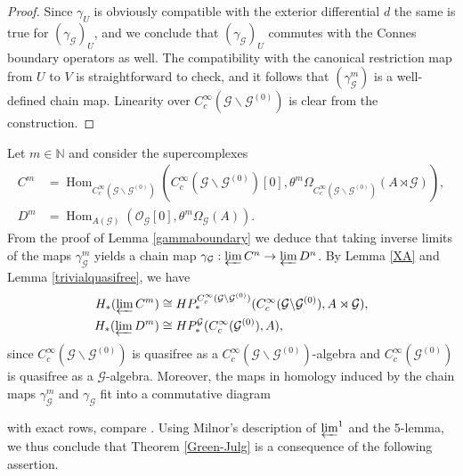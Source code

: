 \documentclass{amsart}
\newcommand{\G}{\mathcal{G}}
\renewcommand{\O}{\mathcal{O}}
\newcommand{\ccinfty}{C_c^\infty}
\DeclareMathOperator{\Hom}{Hom}
\begin{document}
\begin{proof}
Since $ \gamma_U $ is obviously compatible with the exterior differential $ d $ the same is true for $ (\gamma_\G)_U $, 
and we conclude that $ (\gamma_\G)_U $ commutes with the Connes boundary operators as well. The compatibility with the canonical restriction map from $ U $ to $ V $  
is straightforward to check, and it follows that $ (\gamma^m_\G) $ is a well-defined chain map. Linearity over $ \ccinfty(\G \backslash \G^{(0)}) $ is clear from the construction. 
\end{proof}

Let $ m \in \mathbb{N} $ and consider the supercomplexes    
\begin{align*}
C^m &= \Hom_{\ccinfty(\G\backslash\G^{(0)})}(\ccinfty(\G\backslash\G^{(0)})[0], 
\theta^m \Omega_{\ccinfty(\G\backslash\G^{(0)})}(A \rtimes \G)), \\
D^m &= \Hom_{A(\G)}(\O_\G[0], \theta^m \Omega_{\G}(A)). 
\end{align*} 
From the proof of Lemma \ref{gammaboundary} we deduce that taking inverse limits of the maps $ \gamma_\G^m $ yields a chain map $ \gamma_\G: \varprojlim C^n \rightarrow \varprojlim D^n $. 
By Lemma \ref{XA} and Lemma \ref{trivialquasifree}, we have
\begin{align*}
H_*(\varprojlim C^m) &\cong HP_*^{\ccinfty(\G\backslash\G^{(0)})}(\ccinfty(\G\backslash \G^{(0)}), A \rtimes \G), \\ 
H_*(\varprojlim D^m) &\cong HP_*^\G(\ccinfty(\G^{(0)}),A), 
\end{align*}  
since $ \ccinfty(\G \backslash \G^{(0)}) $ is quasifree as a $ \ccinfty(\G \backslash \G^{(0)}) $-algebra and $ \ccinfty(\G^{(0)}) $ is quasifree as a $ \G $-algebra. 
Moreover, the maps in homology induced by the chain maps $ \gamma^m_\G $ and $ \gamma_\G $ fit into a commutative diagram  
\begin{center}
\end{center}
with exact rows, compare \cite[Theorem 3.5.8]{WEIBEL_homologicalalgebra}. 
Using Milnor's description of $ \varprojlim^1 $ and the $ 5 $-lemma, we thus conclude that Theorem \ref{Green-Julg} is a consequence of the following assertion. 
\end{document}
